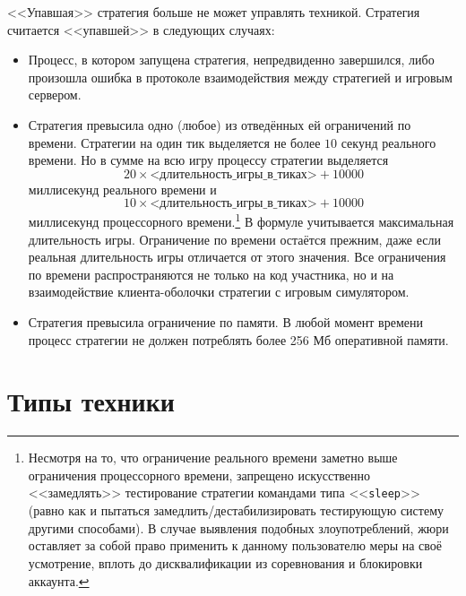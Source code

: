 <<Упавшая>> стратегия больше не может управлять техникой. Стратегия считается <<упавшей>> в следующих случаях:
\begin{itemize}
  \item Процесс, в котором запущена стратегия, непредвиденно завершился, либо произошла ошибка в протоколе взаимодействия между стратегией
        и игровым сервером.
  \item Стратегия превысила одно (любое) из отведённых ей ограничений по времени. Стратегии на один тик выделяется не более $10$ секунд
        реального времени. Но в сумме на всю игру процессу стратегии выделяется
        \begin{equation}
        20\times\textit{<длительность\_игры\_в\_тиках>}+10000
        \end{equation}
        миллисекунд реального времени и
        \begin{equation}
        10\times\textit{<длительность\_игры\_в\_тиках>}+10000
        \end{equation}
        миллисекунд процессорного времени.\footnote[1]{Несмотря на то, что ограничение реального времени заметно выше ограничения
        процессорного времени, запрещено искусственно <<замедлять>> тестирование стратегии командами типа <<\texttt{sleep}>> (равно как и
        пытаться замедлить/дестабилизировать тестирующую систему другими способами). В случае выявления подобных злоупотреблений, жюри
        оставляет за собой право применить к данному пользователю меры на своё усмотрение, вплоть до дисквалификации из соревнования и
        блокировки аккаунта.} В формуле учитывается максимальная длительность игры. Ограничение по времени остаётся прежним, даже если
        реальная длительность игры отличается от этого значения. Все ограничения по времени распространяются не только на код участника, но
        и на взаимодействие клиента-оболочки стратегии с игровым симулятором.
  \item Стратегия превысила ограничение по памяти. В любой момент времени процесс стратегии не должен потреблять более 256 Мб оперативной
        памяти.
\end{itemize}

\section{Типы техники}

